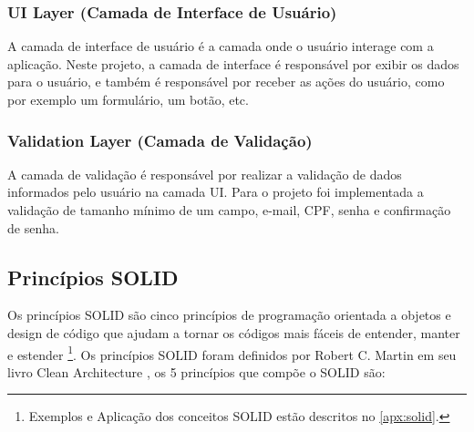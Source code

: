 \documentclass[12pt]{article}
\begin{document}
\subsubsection{UI Layer (Camada de Interface de Usuário)}
\label{uiLayer}
A camada de interface de usuário é a camada onde o usuário interage com a aplicação. Neste projeto, a camada de interface é responsável por exibir os dados para o usuário, e também é responsável por receber as ações do usuário, como por exemplo um formulário, um botão, etc.

\subsubsection{Validation Layer (Camada de Validação)}
\label{validationLayer}
A camada de validação é responsável por realizar a validação de dados informados pelo usuário na camada UI. Para o projeto foi implementada a validação de tamanho mínimo de um campo, e-mail, CPF, senha e confirmação de senha.

\subsection{Princípios SOLID}
\label{SOLID}
Os princípios SOLID são cinco princípios de programação orientada a objetos e design de código que ajudam a tornar os códigos mais fáceis de entender, manter e estender \footnote{Exemplos e Aplicação dos conceitos SOLID estão descritos no \autoref{apx:solid}.}. Os princípios SOLID foram definidos por Robert C. Martin em seu livro Clean Architecture \cite{cleanArchitecture}, os 5 princípios que compõe o SOLID são:
 

\end{document}
